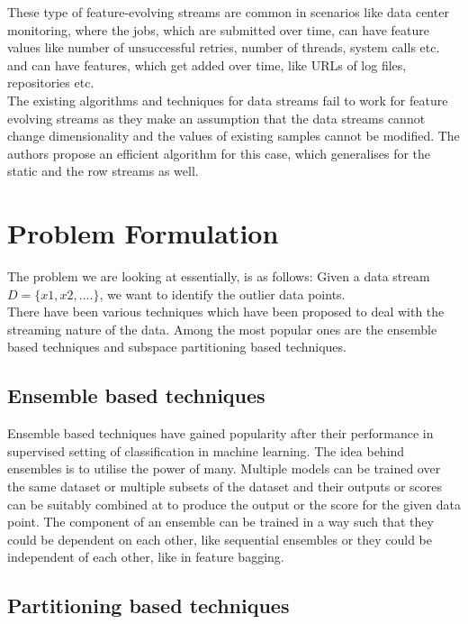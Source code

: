 \documentclass{article}
\begin{document}
    These type of feature-evolving streams are common in scenarios like data center monitoring, where the jobs, which are submitted over time, can have feature values like number of unsuccessful retries, number of threads, system calls etc. and can have features, which get added over time, like URLs of log files, repositories etc. \\

    The existing algorithms and techniques for data streams fail to work for feature evolving streams as they make an assumption that the data streams cannot change dimensionality and the values of existing samples cannot be modified. The authors propose an efficient algorithm for this case, which generalises for the static and the row streams as well.

    \section{Problem Formulation}

    The problem we are looking at essentially, is as follows: Given a data stream $D = \{x1, x2, ....\}$, we want to identify the outlier data points. \\

    There have been various techniques\cite{tran2016distance}\cite{tan2011fast}\cite{aggarwal2013outlier} which have been proposed to deal with the streaming nature of the data. Among the most popular ones are the ensemble based techniques and subspace partitioning based techniques. \\ 

    \subsection{Ensemble based techniques}

    Ensemble based techniques\cite{aggarwal2013outlier} have gained popularity after their performance in supervised setting of classification in machine learning. The idea behind ensembles is to utilise the power of many. Multiple models can be trained over the same dataset or multiple subsets of the dataset and their outputs or scores can be suitably combined at to produce the output or the score for the given data point. The component of an ensemble can be trained in a way such that they could be dependent on each other, like sequential ensembles or they could be independent of each other, like in feature bagging. 

    \subsection{Partitioning based techniques}
\end{document}
